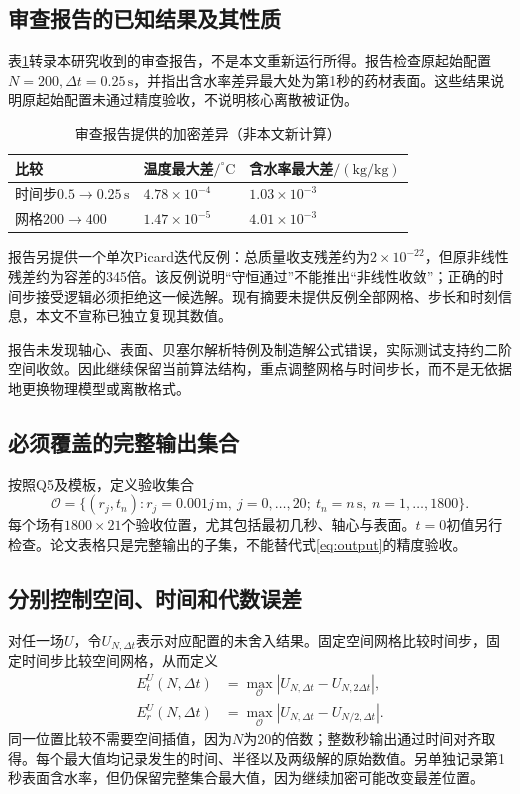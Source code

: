 \documentclass[UTF8,a4paper,zihao=-4,fontset=none]{ctexart}
\numberwithin{equation}{section}
\newcommand{\units}[1]{\,\mathrm{#1}}
\begin{document}
\subsection{审查报告的已知结果及其性质}
表\ref{tab:review}转录本研究收到的审查报告，不是本文重新运行所得。报告检查原起始配置$N=200,\Delta t=0.25\units s$，并指出含水率差异最大处为第1秒的药材表面。这些结果说明原起始配置未通过精度验收，不说明核心离散被证伪。

\begin{table}[htbp]
\centering
\caption{审查报告提供的加密差异（非本文新计算）}\label{tab:review}
\begin{tabular}{@{}lll@{}}
\toprule
比较 & 温度最大差$/^\circ\mathrm C$ & 含水率最大差$/(\mathrm{kg/kg})$\\
\midrule
时间步$0.5\to0.25\units s$ & $4.78\times10^{-4}$ & $1.03\times10^{-3}$\\
网格$200\to400$ & $1.47\times10^{-5}$ & $4.01\times10^{-3}$\\
\bottomrule
\end{tabular}
\end{table}

报告另提供一个单次Picard迭代反例：总质量收支残差约为$2\times10^{-22}$，但原非线性残差约为容差的345倍。该反例说明“守恒通过”不能推出“非线性收敛”；正确的时间步接受逻辑必须拒绝这一候选解。现有摘要未提供反例全部网格、步长和时刻信息，本文不宣称已独立复现其数值。

报告未发现轴心、表面、贝塞尔解析特例及制造解公式错误，实际测试支持约二阶空间收敛。因此继续保留当前算法结构，重点调整网格与时间步长，而不是无依据地更换物理模型或离散格式。

\subsection{必须覆盖的完整输出集合}
按照Q5及模板，定义验收集合
\begin{equation}
\mathcal O=\{(r_j,t_n):r_j=0.001j\units m,\ j=0,\ldots,20;\
t_n=n\units s,\ n=1,\ldots,1800\}.
\label{eq:output}
\end{equation}
每个场有$1800\times21$个验收位置，尤其包括最初几秒、轴心与表面。$t=0$初值另行检查。论文表格只是完整输出的子集，不能替代式\eqref{eq:output}的精度验收。

\subsection{分别控制空间、时间和代数误差}
对任一场$U$，令$U_{N,\Delta t}$表示对应配置的未舍入结果。固定空间网格比较时间步，固定时间步比较空间网格，从而定义
\begin{equation}
\begin{aligned}
E_t^U(N,\Delta t)&=\max_{\mathcal O}|U_{N,\Delta t}-U_{N,2\Delta t}|,\\
E_r^U(N,\Delta t)&=\max_{\mathcal O}|U_{N,\Delta t}-U_{N/2,\Delta t}|.
\end{aligned}
\label{eq:refinement}
\end{equation}
同一位置比较不需要空间插值，因为$N$为20的倍数；整数秒输出通过时间对齐取得。每个最大值均记录发生的时间、半径以及两级解的原始数值。另单独记录第1秒表面含水率，但仍保留完整集合最大值，因为继续加密可能改变最差位置。
\end{document}
